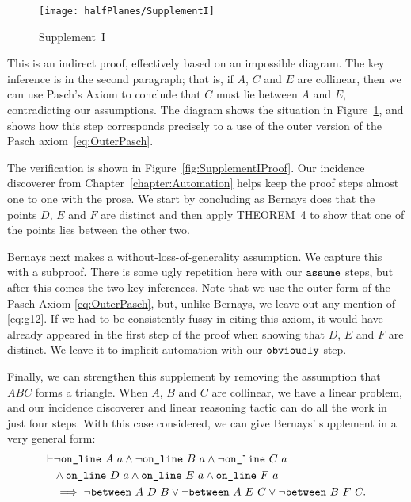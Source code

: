 \begin{figure}
  \centering\texttt{[image: halfPlanes/SupplementI]}
  \caption{Supplement~I}
  \label{fig:SupplementI}
\end{figure}

This is an indirect proof, effectively based on an impossible diagram. The key inference is in the second paragraph; that is, if $A$, $C$ and $E$ are collinear, then we can use Pasch's Axiom to conclude that $C$ must lie between $A$ and $E$, contradicting our assumptions. The diagram shows the situation in Figure~\ref{fig:SupplementI}, and shows how this step corresponds precisely to a use of the outer version of the Pasch axiom~\eqref{eq:OuterPasch}.

The verification is shown in Figure~\ref{fig:SupplementIProof}. Our incidence discoverer from Chapter~\ref{chapter:Automation} helps keep the proof steps almost one to one with the prose. We start by concluding as Bernays does that the points $D$, $E$ and $F$ are distinct and then apply THEOREM~4 to show that one of the points lies between the other two.

Bernays next makes a without-loss-of-generality assumption. We capture this with a subproof. There is some ugly repetition here with our $\texttt{assume}$ steps, but after this comes the two key inferences. Note that we use the outer form of the Pasch Axiom \eqref{eq:OuterPasch}, but, unlike Bernays, we leave out any mention of \eqref{eq:g12}. If we had to be consistently fussy in citing this axiom, it would have already appeared in the first step of the proof when showing that $D$, $E$ and $F$ are distinct. We leave it to implicit automation with our $\texttt{obviously}$ step.

Finally, we can strengthen this supplement by removing the assumption that $ABC$ forms a triangle. When $A$, $B$ and $C$ are collinear, we have a linear problem, and our incidence discoverer and linear reasoning tactic can do all the work in just four steps. With this case considered, we can give Bernays' supplement in a very general form:
\begin{equation}\label{eq:SupplementI}
  \begin{split}
    \vdash&\neg\code{on\_line}\ A\ a \wedge \neg\code{on\_line}\ B\ a \wedge \neg\code{on\_line}\ C\ a\\
    &\wedge \code{on\_line}\ D\ a \wedge \code{on\_line}\ E\ a \wedge \code{on\_line}\ F\ a\\
    &\implies \neg\between{A}{D}{B} \vee \neg\between{A}{E}{C} \vee \neg\between{B}{F}{C}.
  \end{split}
\end{equation}

